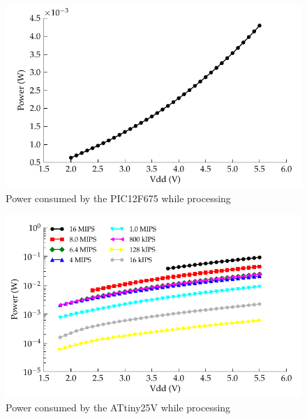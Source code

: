 \begin{figure}
\begin{centering}
\includegraphics{content/pt1/02-Microcontrollers/graphics/Graph_PIC12F675_Clock_Power}
\par\end{centering}

\protect\caption{\label{graph:CLK_POWER_12F675-1}Power consumed by the PIC12F675 while
processing}
\end{figure}
\begin{figure}
\begin{centering}
\includegraphics{content/pt1/02-Microcontrollers/graphics/Graph_ATtiny25V_Clock_Power}
\par\end{centering}

\protect\caption{\label{graph:CLK_POWER_ATtiny25V}Power consumed by the ATtiny25V
while processing}
\end{figure}
